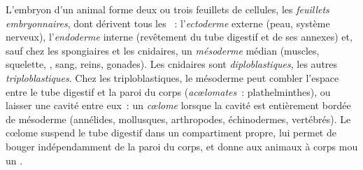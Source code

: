 \begin{definition}\label{def:b1:body-plans-tissues:layers}
L'embryon d'un animal forme deux ou trois feuillets de cellules, les
\emph{feuillets embryonnaires}, dont
dérivent tous les ~: l'\emph{ectoderme} externe
(peau, système nerveux), l'\emph{endoderme} interne
(revêtement du tube digestif et de ses annexes) et, sauf chez les
spongiaires et les cnidaires, un \emph{mésoderme}
médian (muscles, squelette, , sang, reins, gonades). Les
cnidaires sont \emph{diploblastiques}, les autres
\emph{triploblastiques}. Chez les triploblastiques, le mésoderme peut
combler l'espace entre le tube digestif et la paroi du corps
(\emph{acœlomates}~: plathelminthes), ou laisser une cavité entre eux~:
un \emph{cœlome} lorsque la cavité est entièrement bordée
de mésoderme (annélides, mollusques, arthropodes, échinodermes,
vertébrés). Le cœlome suspend le tube digestif dans un compartiment
propre, lui permet de bouger indépendamment de la paroi du corps, et
donne aux animaux à corps mou un .
\end{definition}

